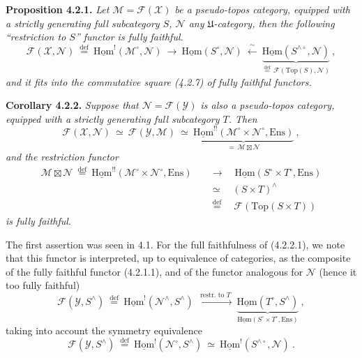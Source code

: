 \documentclass[11pt]{article}
\newcommand{\msp}[1]{\marginpar{\footnotesize [#1]}}
\newcommand{\cM}{\mathcal{M}}
\newcommand{\cN}{\mathcal{N}}
\newcommand{\cX}{\mathcal{X}}
\newcommand{\cY}{\mathcal{Y}}
\newcommand{\cF}{\mathcal{F}}
\newcommand{\uHom}{\underline{\mathrm{Hom}}}
\newcommand{\Ens}{\mathrm{Ens}}
\newcommand{\Top}{\mathrm{Top}}
\newcommand{\defeq}{\overset{\text{def}}{=}}
\newcommand{\bt}{\boxtimes}
\begin{document}
\textbf{Proposition 4.2.1.} \textit{Let $\cM=\cF(\cX)$ be a pseudo-topos category, equipped with a strictly generating full subcategory $S$, $\cN$ any $\mathfrak{U}$-category, then the following ``restriction to $S$'' functor is fully faithful.}
\[
\cF(\cX,\cN) \ \defeq\ \uHom^{!}(\cM^{\circ},\cN) \ \longrightarrow\ \uHom(S^{\circ},\cN) \ \xleftarrow{\ \sim\ }\ \underbrace{\uHom(S^{\wedge\circ},\cN)}_{\defeq\, \cF(\Top(S),\cN)} \ ,
\tag*{(4.2.1.1)}
\]
\textit{and it fits into the commutative square (4.2.7) of fully faithful functors.}

\textbf{Corollary 4.2.2.} \textit{Suppose that $\cN=\cF(\cY)$ is also a pseudo-topos category, equipped with a strictly generating full subcategory $T$. Then}
\[
\cF(\cX,\cN) \ \simeq\ \cF(\cY,\cM) \ \simeq\ \underbrace{\uHom^{!!}(\cM^{\circ}\times\cN^{\circ},\Ens)}_{=\,\cM\bt\cN} \ ,
\]
\textit{and the restriction functor}
\[
\begin{aligned}
\cM\bt\cN \ \defeq\ \uHom^{!!}(\cM^{\circ}\times\cN^{\circ},\Ens) \quad &\longrightarrow \quad \uHom(S^{\circ}\times T^{\circ},\Ens)\\
&\simeq \quad (S\times T)^{\wedge}\\
&\defeq \quad \cF(\Top(S\times T))
\end{aligned}
\tag*{(4.2.2.1)}
\]
\textit{is fully faithful.}

The first assertion was seen in 4.1. For the full faithfulness of (4.2.2.1), we note that this functor is interpreted, up to equivalence of categories, as the composite of the fully faithful functor (4.2.1.1), and of the functor
\msp{page 62}
analogous for $\cN$ (hence it too fully faithful)
\[
\cF(\cY,S^{\wedge}) \ \defeq\ \uHom^{!}(\cN^{\wedge},S^{\wedge}) \ \xrightarrow{\ \text{restr. to } T\ }\ \underbrace{\uHom(T^{\circ},S^{\wedge})}_{\uHom(S^{\circ}\times T^{\circ},\Ens)} \ ,
\tag*{(4.2.2.2)} %
\]
taking into account the symmetry equivalence
\[
\cF(\cY,S^{\wedge}) \ \defeq\ \uHom^{!}(\cN^{\circ},S^{\wedge}) \ \simeq\ \uHom^{!}(S^{\wedge\circ},\cN) \ .
\tag*{(4.2.2.3)}
\]
\end{document}
